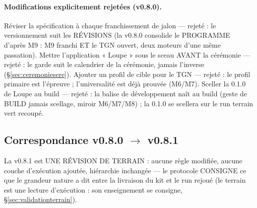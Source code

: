 \paragraph{Modifications explicitement rejetées (v0.8.0).} Réviser la spécification
à chaque franchissement de jalon — rejeté : le versionnement suit les RÉVISIONS (la
v0.8.0 consolide le PROGRAMME d'après M9 : M9 franchi ET le TGN ouvert, deux
moteurs d'une même passation). Mettre l'application « Loupe » sous le sceau AVANT
la cérémonie — rejeté : le garde suit le calendrier de la cérémonie, jamais
l'inverse (§\ref{sec:ceremoniesere}). Ajouter un profil de cible pour le TGN —
rejeté : le profil primaire  est l'épreuve ; l'universalité
est déjà prouvée (M6/M7). Sceller la 0.1.0 de Loupe au build — rejeté : la balise
de développement naît au build (geste de BUILD jamais scellage, miroir
M6/M7/M8) ; la 0.1.0 se scellera sur le run terrain vert recoupé.

\subsection{Correspondance v0.8.0 $\to$ v0.8.1}\label{sec:evolutions081}

La v0.8.1 est UNE RÉVISION DE TERRAIN : aucune règle modifiée, aucune couche
d'exécution ajoutée, hiérarchie inchangée — le protocole CONSIGNE ce que le
grandeur nature a dit entre la livraison du kit et le run rejoué (le terrain est
une lecture d'exécution : son enseignement se consigne, §\ref{sec:validationterrain}).

